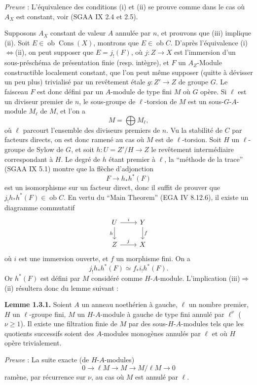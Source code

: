 \documentclass[11pt]{article}
\providecommand{\Cons}{\operatorname{Cons}}
\newcommand{\ob}{\operatorname{ob}}
\providecommand{\ob}{\operatorname{ob}}
\begin{document}
\emph{Preuve} : L'équivalence des conditions (i) et (ii) se prouve comme dans le cas où $A_X$ est constant, voir (SGAA IX 2.4 et 2.5).

Supposons $A_X$ constant de valeur $A$ annulée par $n$, et prouvons que (iii) implique (ii). Soit $E\in\ob\Cons(X)$, montrons que $E\in\ob C$. D'après l'équivalence (i)$\Leftrightarrow$(ii), on peut supposer que $E=j_!(F)$, où $j:Z\to X$ est l'immersion d'un sous-préschéma de présentation finie (resp. intègre), et $F$ un $A_Z$-Module constructible localement constant, que l'on peut même supposer (quitte à dévisser un peu plus) trivialisé par un revêtement étale $g:Z'\to Z$ de groupe $G$. Le faisceau $F$ est donc défini par un $A$-module de type fini $M$ où $G$ opère. Si $\ell$ est un diviseur premier de $n$, le sous-groupe de $\ell$-torsion de $M$ est un sous-$G$-$A$-module $M_\ell$ de $M$, et l'on a
\[
        M=\bigoplus M_\ell,
\]
où $\ell$ parcourt l'ensemble des diviseurs premiers de $n$. Vu la stabilité de $C$ par facteurs directs, on est donc ramené au cas où $M$ est de $\ell$-torsion. Soit $H$ un $\ell$-groupe de Sylow de $G$, et soit $h:U=Z'/H\to Z$ le revêtement intermédiaire correspondant à $H$. Le degré de $h$ étant premier à $\ell$, la ``méthode de la trace'' (SGAA IX 5.1) montre que la flèche d'adjonction
\[
        F\longrightarrow h_*h^*(F)
\]
est un isomorphisme sur un facteur direct, donc il suffit de prouver que $j_!h_*h^*(F)\in\ob C$. En vertu du ``Main Theorem'' (EGA IV 8.12.6), il existe un diagramme commutatif
\[
\begin{tikzcd}
U \arrow[r,"i"] \arrow[d,"h"'] & Y \arrow[d,"f"]\\
Z \arrow[r,"j"] & X
\end{tikzcd}
\]
où $i$ est une
immersion ouverte, et $f$ un morphisme fini. On a
\[
        j_!h_*h^*(F) \simeq f_* i_! h^*(F).
\]
Or $h^*(F)$ est défini par $M$ considéré comme $H$-$A$-module. L'implication (iii)$\Rightarrow$(ii) résultera donc du lemme suivant :

\textbf{Lemme 1.3.1.} Soient $A$ un anneau noethérien à gauche, $\ell$ un nombre premier, $H$ un $\ell$-groupe fini, $M$ un $H$-$A$-module à gauche de type fini annulé par $\ell^\nu$ ($\nu\geq 1$). Il existe une filtration finie de $M$ par des sous-$H$-$A$-modules tels que les quotients successifs soient des $A$-modules monogènes annulés par $\ell$ et où $H$ opère trivialement.

\emph{Preuve} : La suite exacte (de $H$-$A$-modules)
\[
        0\longrightarrow \ell M\longrightarrow M\longrightarrow M/\ell M\longrightarrow 0
\]
ramène, par récurrence sur $\nu$, au cas où $M$ est annulé par $\ell$.
\end{document}

